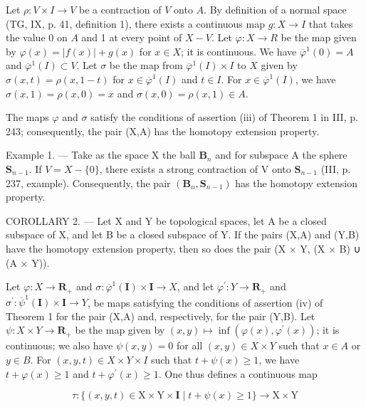Let \(\rho\colon V \times I \to V\) be a contraction of \(V\) onto \(A\). By definition of a normal space (TG, IX, p. 41, definition 1), there exists a continuous map \(g\colon X \to I\) that takes the value 0 on \(A\) and 1 at every point of \(X - V\). Let \(\varphi\colon X \to R\) be the map given by \(\varphi(x) = |f(x)| + g(x)\) for \(x \in X\); it is continuous. We have \(\overline{\varphi}^{1}(0) = A\) and \(\overline{\varphi}^{1}(I) \subset V\). Let \(\sigma\) be the map from \(\overline{\varphi}^{1}(I) \times I\) to \(X\) given by \(\sigma(x,t) = \rho(x,1-t)\) for \(x \in \overline{\varphi}^{1}(I)\) and \(t \in I\). For \(x \in \overline{\varphi}^{1}(I)\), we have \(\sigma(x,1) = \rho(x,0) = x\) and \(\sigma(x,0) = \rho(x,1) \in A\).

The maps \(\varphi\) and \(\sigma\) satisfy the conditions of assertion (iii) of Theorem 1 in III, p. 243; consequently, the pair (X,A) has the homotopy extension property.

Example 1. --- Take as the space X the ball \(\mathbf{B}_{n}\) and for subspace A the sphere \(\mathbf{S}_{n-1}\). If \(V = X - \{0\}\), there exists a strong contraction of V onto \(\mathbf{S}_{n-1}\) (III, p. 237, example). Consequently, the pair \((\mathbf{B}_{n}, \mathbf{S}_{n-1})\) has the homotopy extension property.

COROLLARY 2. --- Let X and Y be topological spaces, let A be a closed subspace of X, and let B be a closed subspace of Y. If the pairs (X,A) and (Y,B) have the homotopy extension property, then so does the pair (X × Y, (X × B) ∪ (A × Y)).

Let \(\varphi\colon X\to\mathbf{R}_{+}\) and \(\sigma\colon\overline{\varphi}^{1}(\mathbf{I})\times\mathbf{I}\to X\), and let \(\varphi^{\prime}\colon Y\to\mathbf{R}_{+}\) and \(\sigma^{\prime}\colon\overline{\psi}^{1}(\mathbf{I})\times\mathbf{I}\to Y\), be maps satisfying the conditions of assertion (iv) of Theorem 1 for the pair (X,A) and, respectively, for the pair (Y,B). Let \(\psi\colon X\times Y\to\mathbf{R}_{+}\) be the map given by \((x,y)\mapsto\inf(\varphi(x),\varphi^{\prime}(x))\); it is continuous; we also have \(\psi(x,y)=0\) for all \((x,y)\in X\times Y\) such that \(x\in A\) or \(y\in B\). For \((x,y,t)\in X\times Y\times I\) such that \(t+\psi(x)\geqslant1\), we have \(t+\varphi(x)\geqslant1\) and \(t+\varphi^{\prime}(x)\geqslant1\). One thus defines a continuous map

\[
\tau \colon \{(x, y, t) \in \mathrm{X} \times \mathrm{Y} \times \mathbf {I} \mid t + \psi (x) \geqslant 1 \} \rightarrow \mathrm{X} \times \mathrm{Y}
\]

